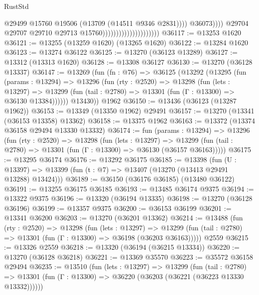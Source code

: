 \begin{lexlean}{RustStd}
\begin{coremodule}
                                                          @29499
                                                          @15760
                                                          @19506
                                                          (@13709 (@14511 @9346 @2831))))
                                                      @36073))))
                                              @29704
                                              @29707
                                              @29710
                                              @29713
                                              @15760)))))))))))))))))))))
@36117 := @13253 @1620
@36121 := @13255 (@13259 @1620) (@13265 @1620)
@36122 := @13284 @1620
@36123 := @13274 @36122
@36125 := @13270 (@36123 @13289)
@36127 := @13312 (@13313 @1620)
@36128 := @13308 @36127
@36130 := @13270 (@36128 @13337)
@36147 := @13269
    (fun (fn : @76) =>
    @36125
      (@13292
        (@13295
          (fun (params : @13294) =>
          @13296
            (fun (rty : @2520) =>
            @13298
              (fun (lets : @13297) =>
              @13299 (fun (tail : @2780) => @13301 (fun (Γ : @13300) => @36130 @13384))))))
        @13430))
    @1962
@36150 := @13436 (@36123 (@13287 @1962))
@36153 := @13349 (@13350 @1962) @29491
@36157 := @13270 (@13341 (@36153 @13358) @13362)
@36158 := @13375 @1962
@36163 := @13372 (@13374 @36158 @29494 @13330 @13332)
@36174 := fun (params : @13294) =>
  @13296
    (fun (rty : @2520) =>
    @13298
      (fun (lets : @13297) =>
      @13299 (fun (tail : @2780) => @13301 (fun (Γ : @13300) => @36130 (@36157 @36163)))))
@36175 := @13295 @36174
@36176 := @13292 @36175
@36185 := @13398
    (fun (U : @13397) => @13399 (fun (t : @7) => @13407 (@13270 (@13413 @29491 @13288) @13424)))
@36189 := @36150 (@36176 @36185) (@13480 @36122)
@36191 := @13255 @36175 @36185
@36193 := @13485 @36174 @9375
@36194 := @13322 @9375
@36196 := @13320 (@36194 @13335)
@36198 := @13270 (@36128 @36196)
@36199 := @13357 @9375
@36200 := @36153 @36199
@36201 := @13341 @36200
@36203 := @13270 (@36201 @13362)
@36214 := @13488
    (fun (rty : @2520) =>
    @13298
      (fun (lets : @13297) =>
      @13299 (fun (tail : @2780) => @13301 (fun (Γ : @13300) => @36198 (@36203 @36163)))))
    @2559
@36215 := @13326 @2559
@36218 := @13320 (@36194 (@36215 @13334))
@36220 := @13270 (@36128 @36218)
@36221 := @13369 @35570
@36223 := @35572 @36158 @29494
@36235 := @13510
    (fun (lets : @13297) =>
    @13299
      (fun (tail : @2780) =>
      @13301 (fun (Γ : @13300) => @36220 (@36203 (@36221 (@36223 @13330 @13332))))))

\end{coremodule}
\end{lexlean}
